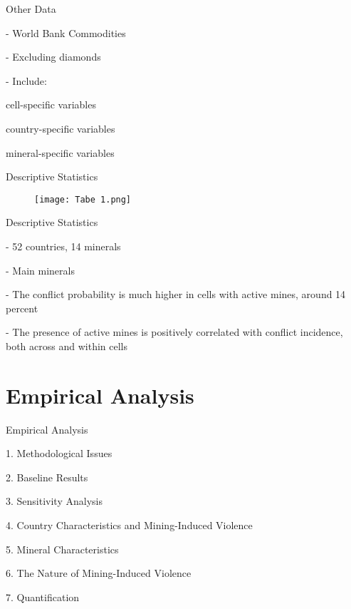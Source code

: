 \documentclass[pdftex,12pt,xcolor=pdftex,table]{beamer}
\theoremstyle{definition}
\theoremstyle{remark}
\numberwithin{equation}{section}
\numberwithin{figure}{section}
\begin{document}
			\begin{frame}{Other Data}
			\justifying
\item - World Bank Commodities
\item - Excluding diamonds
\item - Include:
    \item cell-specific variables 
    \item country-specific variables
    \item mineral-specific variables
		\end{frame}
		
		 \begin{frame}{Descriptive Statistics}
        \justifying
        \begin{figure}[H]
				\centering
				\texttt{[image: Tabe 1.png]}
			\end{figure}
			\end{frame}
		
		\begin{frame}{Descriptive Statistics}
			\justifying
\item - 52 countries, 14 minerals
\item - Main minerals
\item - The conflict probability is much higher in cells with active mines, around 14 percent
\item - The presence of active mines is positively correlated with conflict incidence, both across and within cells
		\end{frame}
	
	\section{Empirical Analysis}
		\begin{frame}{Empirical Analysis}
			\justifying

\item 1. Methodological Issues
\item 2. Baseline Results
\item 3. Sensitivity Analysis 
\item 4. Country Characteristics and Mining-Induced Violence 
\item 5. Mineral Characteristics
\item 6. The Nature of Mining-Induced Violence
\item 7. Quantification

    
		\end{frame}
		
\end{document}
